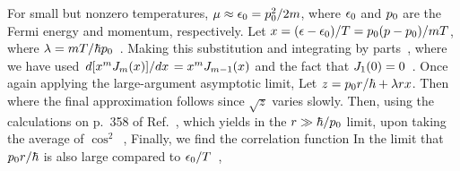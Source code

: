{	For small but nonzero temperatures, $\mu \approx \epsilon_0 = p_0^2 / 2m$, where $\epsilon_0$ and $p_0$ are the Fermi energy and momentum, respectively.  Let $x = (\epsilon - \epsilon_0) / T = p_0 (p - p_0) / mT$, where $\lambda = m T / \hbar p_0$~\cite[p.~358]{Landau2}.  Making this substitution and integrating by parts~\cite[p.~358]{Landau},
	where we have used $\dv*{[ x^m J_m(x) ]}{x} = x^m J_{m - 1}(x)$ and the fact that $J_1(0) = 0$~\cite{BesselJ}.  Once again applying the large-argument asymptotic limit,
	Let $z = p_0 r / \hbar + \lambda r x$.  Then
	where the final approximation follows since $\sqrt{z}$ varies slowly.  Then, using the calculations on p.~358 of Ref.~\cite{Landau2},
	which yields in the $r \gg \hbar / p_0$ limit, upon taking the average of $\cos^2$~\cite[p.~358]{Landau2},
	Finally, we find the correlation function
	In the limit that $p_0 r / \hbar$ is also large compared to $\epsilon_0 / T$~\cite[p.~358]{Landau2},

}
